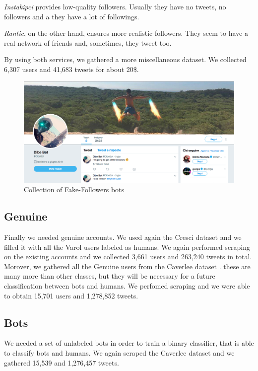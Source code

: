 \emph{Instakipci} provides low-quality followers. Usually they have no tweets, no followers and a they have a lot of followings.

\emph{Rantic}, on the other hand, ensures more realistic followers. They seem to have a real network of friends and, sometimes, they tweet too.

By using both services, we gathered a more miscellaneous dataset.
We collected 6,307 users and 41,683 tweets for about 20\$.
\begin{figure}
	\centering
	\includegraphics[width=\columnwidth]{chapter3/figure/dibebot.png}
	\caption{Collection of Fake-Followers bots}
	\label{fig:dibebot}
\end{figure}

\subsection{Genuine}
Finally we needed genuine accounts. We used again the Cresci dataset \cite{Cresci} and we filled it with all the Varol users labeled as humans. We again performed scraping on the existing accounts and we collected 3,661 users and 263,240 tweets in total.
Morover, we gathered all the Genuine users from the Caverlee dataset \cite{Lee11sevenmonths}. these are many more than other classes, but they will be necessary for a future classification between bots and humans. We perfomed scraping and we were able to obtain 15,701 users and 1,278,852 tweets.

\subsection{Bots}
We needed a set of unlabeled bots in order to train a binary classifier, that is able to classify bots and humans. We again scraped the Caverlee dataset \cite{Lee11sevenmonths} and we gathered 15,539 and 1,276,457 tweets.

